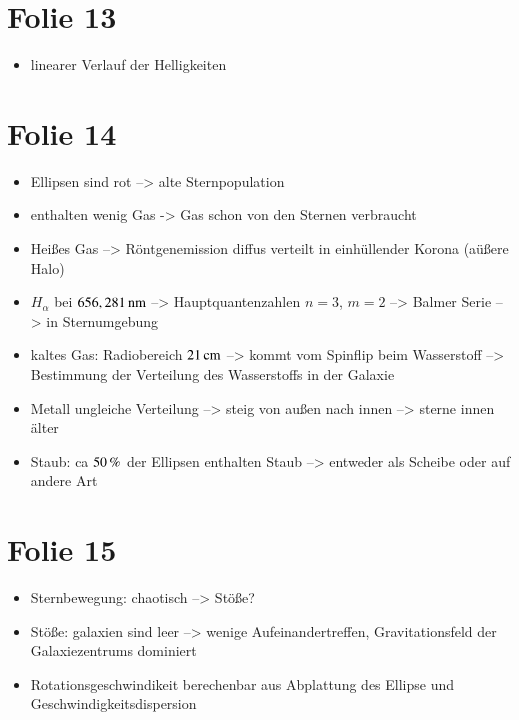 \section{Folie 13}


\begin{itemize}
\item linearer Verlauf der Helligkeiten 
\end{itemize}


\newpage

\section{Folie 14}

\begin{itemize}
\item Ellipsen sind rot --> alte Sternpopulation
\item enthalten wenig Gas -> Gas schon von den Sternen verbraucht
\item Heißes Gas --> Röntgenemission diffus verteilt in einhüllender Korona (aüßere Halo)
\item $H_\alpha$ bei $\unit[656,281]{nm}$ -->  Hauptquantenzahlen $n=3$, $m=2$ --> Balmer Serie --> in Sternumgebung
\item kaltes Gas: Radiobereich $\unit[21]{cm}$ --> kommt vom Spinflip beim Wasserstoff --> Bestimmung der Verteilung des Wasserstoffs in der Galaxie
\item Metall ungleiche Verteilung --> steig von außen nach innen --> sterne innen älter
\item Staub: ca $\unit[50]{\%}$ der Ellipsen enthalten Staub --> entweder als Scheibe oder auf andere Art
\end{itemize}


\section{Folie 15}

\begin{itemize}
\item Sternbewegung: chaotisch --> Stöße?
\item Stöße: galaxien sind leer --> wenige Aufeinandertreffen, Gravitationsfeld der Galaxiezentrums dominiert
\item Rotationsgeschwindikeit berechenbar aus Abplattung des Ellipse und Geschwindigkeitsdispersion
\end{itemize}



